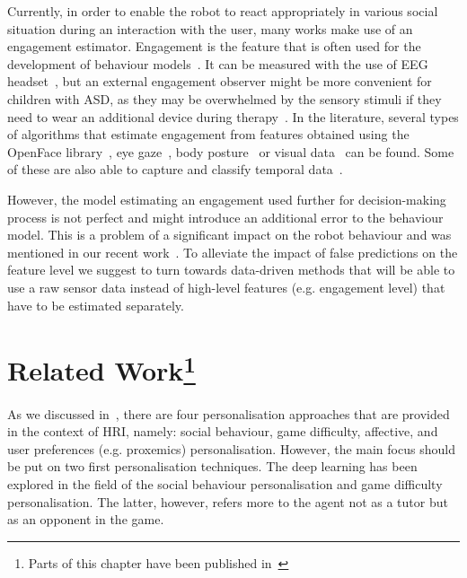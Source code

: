 \documentclass[thesis]{mas_proposal}
\begin{document}
Currently, in order to enable the robot to react appropriately in various social situation during an interaction with the user, many works make use of an engagement estimator. Engagement is the feature that is often used for the development of behaviour models~\cite{senft2015sparc,senft2015human,tsiakas2018task,del2022learning}. It can be measured with the use of EEG headset~\cite{tsiakas2018task}, but an external engagement observer might be more convenient for children with ASD, as they may be overwhelmed by the sensory stimuli if they need to wear an additional device during therapy~\cite{javed2019robotic}. In the literature, several types of algorithms that estimate engagement from features obtained using the OpenFace library~\cite{baltrusaitis2018openface, jain2020modeling, kaur2019domain, karimah2021implementation}, eye gaze~\cite{khorrami2014system},  body posture~\cite{ritschel2017adapting} or visual data~\cite{mane2018engagement, del2020you} can be found. Some of these are also able to capture and classify temporal data~\cite{del2020you, karimah2021implementation}.

However, the model estimating an engagement used further for decision-making process is not perfect and might introduce an additional error to the behaviour model. This is a problem of a significant impact on the robot behaviour and was mentioned in our recent work~\cite{stolarz2022learningbased}. To alleviate the impact of false predictions on the feature level we suggest to turn towards data-driven methods that will be able to use a raw sensor data instead of high-level features (e.g. engagement level) that have to be estimated separately.   


\section[Related Work]{Related Work\footnote{Parts of this chapter have been published in~\cite{stolarz2022personalized}}}

As we discussed in~\cite{stolarz2022personalized}, there are four personalisation approaches that are provided in the context of HRI, namely: social behaviour, game difficulty, affective, and user preferences (e.g. proxemics) personalisation. However, the main focus should be put on two first personalisation techniques. The deep learning has been explored in the field of the social behaviour personalisation and game difficulty personalisation. The latter, however, refers more to the agent not as a tutor but as an opponent in the game.
\end{document}
